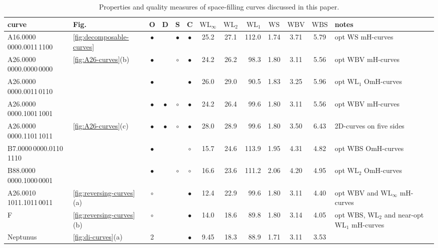 \documentclass[11pt,a4paper]{article}
\def\WLMax{\ensuremath{\mathrm{WL}_\infty}\xspace}
\def\WLEuc{\ensuremath{\mathrm{WL}_2}\xspace}
\def\WLMan{\ensuremath{\mathrm{WL}_1}\xspace}
\def\WS{\ensuremath{\mathrm{WS}}\xspace}
\def\WBV{\ensuremath{\mathrm{WBV}}\xspace}
\def\WBS{\ensuremath{\mathrm{WBS}}\xspace}
\begin{document}
\begin{sidewaystable}\label{tab:results}
\caption{Properties and quality measures of space-filling curves discussed in this paper.}
\def\no{}
\def\half{\ensuremath{\circ}}
\def\yes{\ensuremath{\bullet}}

\addvspace\baselineskip
\def\arraystretch{1.25}
\begin{tabularx}{\hsize}{ll|@{\,}c@{\,}c@{\,}c@{\,}c@{\,}|@{ }c@{ }c@{ }r@{ }|@{\,}c@{\,}|@{\,}c@{\,}c@{\,}|X}
curve      &Fig.&O&D&S&C& \WLMax     & \WLEuc & \WLMan & \WS & \WBV & \WBS &
notes \\
\hline
A16.0000\,0000.0011\,1100 & \ref{fig:decomposable-curves} & \yes  &       & \yes  & \yes  & 25.2 & 27.1   & 112.0  & 1.74 & 3.71 & 5.79 &
opt \WS mH-curves
\\
A26.0000\,0000.0000\,0000 & \ref{fig:A26-curves}(b)       & \yes  & \no   & \half & \yes  & 24.2 & 26.2   & 98.3   & 1.80 & 3.11 & 5.56 &
opt \WBV mH-curves
\\
A26.0000\,0000.0011\,0110 &                               & \yes  & \no   & \no   & \yes  & 26.0 & 29.0   &  90.5  & 1.83 & 3.25 & 5.96 &
opt \WLMan OmH-curves
\\
A26.0000\,0000.1001\,1001 &                               & \yes  & \yes  & \half & \yes  & 24.2 & 26.4   &  99.6  & 1.80 & 3.11 & 5.56 &
opt \WBV mH-curves
\\
A26.0000\,0000.1101\,1011 & \ref{fig:A26-curves}(c)       & \yes  & \yes  & \half & \yes  & 28.0 & 28.9   & 99.6   & 1.80 & 3.50 & 6.43 &
2D-curves on five sides
\\
B\hphantom{0}7.0000\,0000.0110\,1110  &
                                                          & \yes  & \no   & \no   & \half & 15.7 & 24.6   & 113.9  & 1.95 & 4.31 & 4.82 &
opt \WBS OmH-curves
\\
B88.0000\,0000.1000\,0001 &
                                                          & \yes  & \no   & \half & \half & 16.6 & 23.6   & 111.2  & 2.06 & 4.20 & 4.95 &
opt \WLEuc OmH-curves
\\\hline
A26.0010\,1011.1011\,0011 & \ref{fig:reversing-curves}(a) & \half & \no   & \no   & \yes  & 12.4 & 22.9   &  99.6  & 1.80 & 3.11 & 4.40 &
opt \WBV and \WLMax mH-curves
\\
F          & \ref{fig:reversing-curves}(b)                & \half & \no   & \no   & \yes  & 14.0 & 18.6   & 89.8   & 1.80 & 3.14 & 4.05 &
opt \WBS, \WLEuc and near-opt \WLMan mH-curves
\\\hline
Neptunus   & \ref{fig:di-curves}(a)                       & 2     & \no   &  \no  & \yes  & 9.45 & 18.3   & 88.9   & 1.71 & 3.11 & 3.53 &

\end{tabularx}
\end{sidewaystable}
\end{document}
